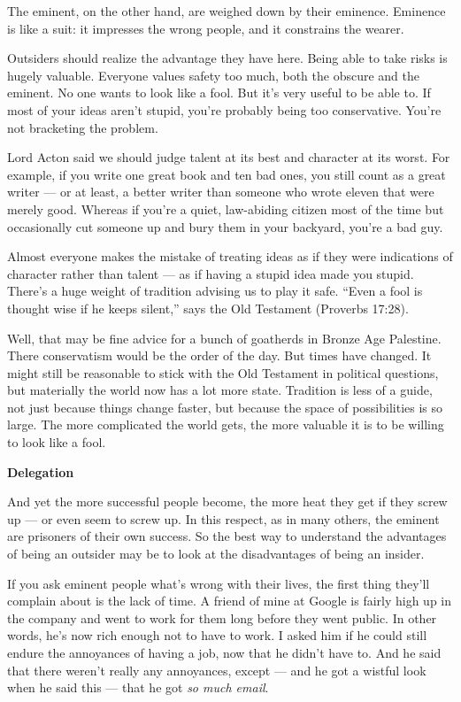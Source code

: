 The eminent, on the other hand, are weighed down by their eminence.
Eminence is like a suit: it impresses the wrong people, and it
constrains the wearer.

Outsiders should realize the advantage they have here. Being able to
take risks is hugely valuable. Everyone values safety too much, both the
obscure and the eminent. No one wants to look like a fool. But it's very
useful to be able to. If most of your ideas aren't stupid, you're
probably being too conservative. You're not bracketing the problem.

Lord Acton said we should judge talent at its best and character at its
worst. For example, if you write one great book and ten bad ones, you
still count as a great writer --- or at least, a better writer than
someone who wrote eleven that were merely good. Whereas if you're a
quiet, law-abiding citizen most of the time but occasionally cut someone
up and bury them in your backyard, you're a bad guy.

Almost everyone makes the mistake of treating ideas as if they were
indications of character rather than talent --- as if having a stupid
idea made you stupid. There's a huge weight of tradition advising us to
play it safe. ``Even a fool is thought wise if he keeps silent,'' says
the Old Testament (Proverbs 17:28).

Well, that may be fine advice for a bunch of goatherds in Bronze Age
Palestine. There conservatism would be the order of the day. But times
have changed. It might still be reasonable to stick with the Old
Testament in political questions, but materially the world now has a lot
more state. Tradition is less of a guide, not just because things change
faster, but because the space of possibilities is so large. The more
complicated the world gets, the more valuable it is to be willing to
look like a fool.

\textbf{Delegation}

And yet the more successful people become, the more heat they get if
they screw up --- or even seem to screw up. In this respect, as in many
others, the eminent are prisoners of their own success. So the best way
to understand the advantages of being an outsider may be to look at the
disadvantages of being an insider.

If you ask eminent people what's wrong with their lives, the first thing
they'll complain about is the lack of time. A friend of mine at Google
is fairly high up in the company and went to work for them long before
they went public. In other words, he's now rich enough not to have to
work. I asked him if he could still endure the annoyances of having a
job, now that he didn't have to. And he said that there weren't really
any annoyances, except --- and he got a wistful look when he said this
--- that he got \emph{so much email}.

